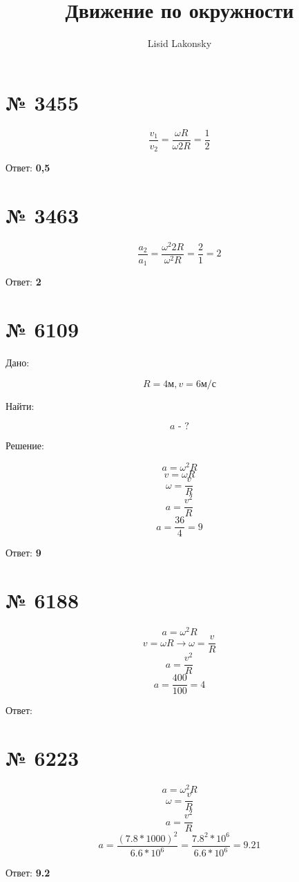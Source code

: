 \documentclass[11pt]{article} %
\title{Движение по окружности}
\author{Lisid Lakonsky}
\begin{document}
\maketitle

\section{№ \textbf{3455}}

$$\frac{v_1}{v_2} = \frac{\omega R}{\omega 2R} = \frac{1}{2}$$

Ответ: \textbf{0,5}

\section{№ \textbf{3463}}

$$\frac{a_2}{a_1} = \frac{\omega^2 2R}{\omega^2 R} = \frac{2}{1} = 2$$

Ответ: \textbf{2}

\section{№ \textbf{6109}}

Дано:

$$R = 4 \text{м}, v = 6 \text{м/с}$$

Найти:

$$ a\text{ - ?} $$

Решение:

$$a = \omega^2 R $$
$$v = \omega R$$
$$\omega = \frac{v}{R}$$
$$a = \frac{v^2}{R}$$
$$a = \frac{36}{4} = 9$$

Ответ: \textbf{9}

\section{№ \textbf{6188}}

$$a = \omega^2 R$$
$$v = \omega R \rightarrow \omega = \frac{v}{R}$$
$$a = \frac{v^2}{R}$$
$$a = \frac{400}{100} = 4$$

Ответ: 

\section{№ \textbf{6223}}

$$a = \omega^2 R$$
$$\omega = \frac{v}{R}$$
$$a = \frac{v^2}{R}$$
$$a = \frac{(7.8 * 1000)^2}{6.6 * 10^6} = \frac{7.8^2 * 10^6}{6.6 * 10^6} = 9.21$$

Ответ: \textbf{9.2}
\end{document}
